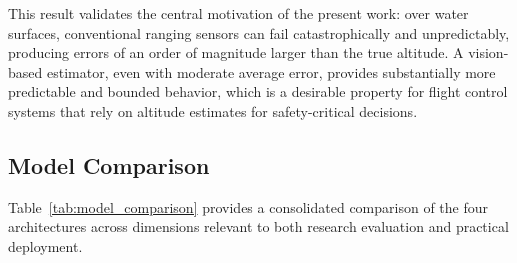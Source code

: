 This result validates the central motivation of the present work: over water surfaces, conventional ranging sensors can fail catastrophically and unpredictably, producing errors of an order of magnitude larger than the true altitude. A vision-based estimator, even with moderate average error, provides substantially more predictable and bounded behavior, which is a desirable property for flight control systems that rely on altitude estimates for safety-critical decisions.

\subsection{Model Comparison}
\label{subsec:model_comparison}

Table~\ref{tab:model_comparison} provides a consolidated comparison of the four architectures across dimensions relevant to both research evaluation and practical deployment.


